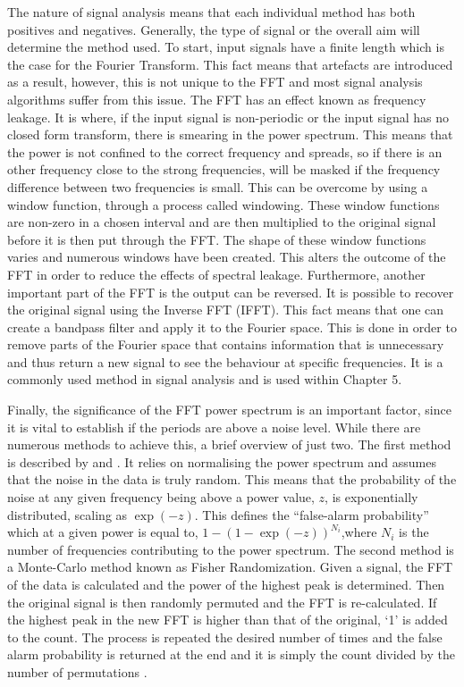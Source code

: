 	The nature of signal analysis means that each individual method has both positives and negatives.
	Generally, the type of signal or the overall aim will determine the method used.
	To start, input signals have a finite length which is the case for the Fourier Transform. 
	This fact means that artefacts are introduced as a result, however, this is not unique to the FFT and most signal analysis algorithms suffer from this issue. 
	The FFT has an effect known as frequency leakage.
    It is where, if the input signal is non-periodic or the input signal has no closed form transform, there is smearing in the power spectrum.
    This means that the power is not confined to the correct frequency and spreads, so if there is an other frequency close to the strong frequencies, will be masked if the frequency difference between two frequencies is small.
	This can be overcome by using a window function, through a process called windowing. These window functions are non-zero in a chosen interval and are then multiplied to the original signal before it is then put through the FFT.
	The shape of these window functions varies and numerous windows have been created. 	
	This alters the outcome of the FFT in order to reduce the effects of spectral leakage.	
    Furthermore, another important part of the FFT is the output can be reversed.
    It is possible to recover the original signal using the Inverse FFT (IFFT).
    This fact means that one can create a bandpass filter and apply it to the Fourier space.
    This is done in order to remove parts of the Fourier space that contains information that is unnecessary and thus return a new signal to see the behaviour at specific frequencies.
    It is a commonly used method in signal analysis and is used within Chapter 5.
    
    Finally, the significance of the FFT power spectrum is an important factor, since it is vital to establish if the periods are above a noise level.
    While there are numerous methods to achieve this, a brief overview of just two.
    The first method is described by \cite{1982ApJ...263..835S} and \cite{1986ApJ...302..757H}.
    It relies on normalising the power spectrum and assumes that the noise in the data is truly random. 
    This means that the probability of the noise at any given frequency being above a power value, $z$, is exponentially distributed, scaling as $\exp(-z)$.
    This defines the ``false-alarm probability'' which at a given power is equal to, $1 - (1 - \exp(-z))^{N_i}$,where $N_i$ is the number of frequencies contributing to the power spectrum.    
    The second method is a Monte-Carlo method known as Fisher Randomization.
    Given a signal, the FFT of the data is calculated and the power of the highest peak is determined.
    Then the original signal is then randomly permuted and the FFT is re-calculated. If the highest peak in the new FFT is higher than that of the original, `1' is added to the count.
    The process is repeated the desired number of times and the false alarm probability is returned at the end and it is simply the count divided by the number of permutations \citealt{1985AJ.....90.2317L}. 
    
